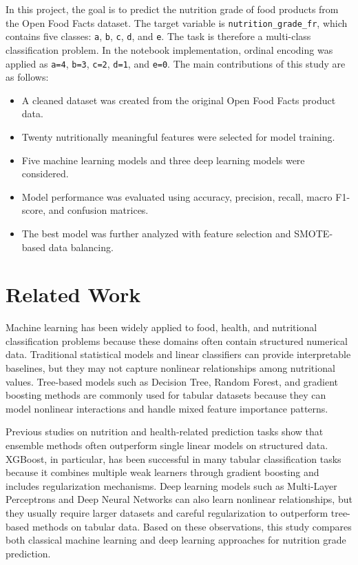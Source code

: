 \documentclass[conference]{IEEEtran}
\begin{document}
In this project, the goal is to predict the nutrition grade of food products from the Open Food Facts dataset. The target variable is \texttt{nutrition\_grade\_fr}, which contains five classes: \texttt{a}, \texttt{b}, \texttt{c}, \texttt{d}, and \texttt{e}. The task is therefore a multi-class classification problem. In the notebook implementation, ordinal encoding was applied as \texttt{a=4}, \texttt{b=3}, \texttt{c=2}, \texttt{d=1}, and \texttt{e=0}. The main contributions of this study are as follows:

\begin{itemize}
    \item A cleaned dataset was created from the original Open Food Facts product data.
    \item Twenty nutritionally meaningful features were selected for model training.
    \item Five machine learning models and three deep learning models were considered.
    \item Model performance was evaluated using accuracy, precision, recall, macro F1-score, and confusion matrices.
    \item The best model was further analyzed with feature selection and SMOTE-based data balancing.
\end{itemize}

\section{Related Work}
Machine learning has been widely applied to food, health, and nutritional classification problems because these domains often contain structured numerical data. Traditional statistical models and linear classifiers can provide interpretable baselines, but they may not capture nonlinear relationships among nutritional values. Tree-based models such as Decision Tree, Random Forest, and gradient boosting methods are commonly used for tabular datasets because they can model nonlinear interactions and handle mixed feature importance patterns.

Previous studies on nutrition and health-related prediction tasks show that ensemble methods often outperform single linear models on structured data. XGBoost, in particular, has been successful in many tabular classification tasks because it combines multiple weak learners through gradient boosting and includes regularization mechanisms. Deep learning models such as Multi-Layer Perceptrons and Deep Neural Networks can also learn nonlinear relationships, but they usually require larger datasets and careful regularization to outperform tree-based methods on tabular data. Based on these observations, this study compares both classical machine learning and deep learning approaches for nutrition grade prediction.
\end{document}
